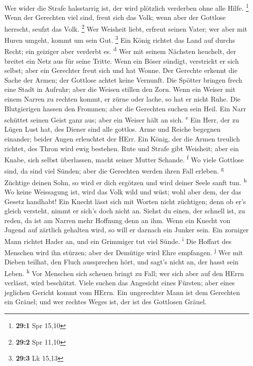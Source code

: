 Wer wider die Strafe halsstarrig ist, der wird plötzlich
verderben ohne alle Hilfe. \footnote{\textbf{29:1} Spr 15,10}
 Wenn der Gerechten viel sind, freut sich das Volk; wenn
aber der Gottlose herrscht, seufzt das Volk. \footnote{\textbf{29:2} Spr
  11,10}  Wer Weisheit liebt, erfreut seinen Vater; wer
aber mit Huren umgeht, kommt um sein Gut. \footnote{\textbf{29:3} Lk
  15,13}  Ein König richtet das Land auf durchs Recht; ein
geiziger aber verderbt es. \textsuperscript{d}  Wer mit
seinem Nächsten heuchelt, der breitet ein Netz aus für seine Tritte.
 Wenn ein Böser sündigt, verstrickt er sich selbst; aber
ein Gerechter freut sich und hat Wonne.  Der Gerechte
erkennt die Sache der Armen; der Gottlose achtet keine Vernunft.
 Die Spötter bringen frech eine Stadt in Aufruhr; aber die
Weisen stillen den Zorn.  Wenn ein Weiser mit einem Narren
zu rechten kommt, er zürne oder lache, so hat er nicht Ruhe.
 Die Blutgierigen hassen den Frommen; aber die Gerechten
suchen sein Heil.  Ein Narr schüttet seinen Geist ganz
aus; aber ein Weiser hält an sich. \textsuperscript{e} 
Ein Herr, der zu Lügen Lust hat, des Diener sind alle gottlos.
 Arme und Reiche begegnen einander; beider Augen
erleuchtet der HErr.  Ein König, der die Armen treulich
richtet, des Thron wird ewig bestehen.  Rute und Strafe
gibt Weisheit; aber ein Knabe, sich selbst überlassen, macht seiner
Mutter Schande. \textsuperscript{f}  Wo viele Gottlose
sind, da sind viel Sünden; aber die Gerechten werden ihren Fall erleben.
\textsuperscript{g}  Züchtige deinen Sohn, so wird er
dich ergötzen und wird deiner Seele sanft tun. \textsuperscript{h}
 Wo keine Weissagung ist, wird das Volk wild und wüst;
wohl aber dem, der das Gesetz handhabt!  Ein Knecht lässt
sich mit Worten nicht züchtigen; denn ob er's gleich versteht, nimmt er
sich's doch nicht an.  Siehst du einen, der schnell ist,
zu reden, da ist am Narren mehr Hoffnung denn an ihm. 
Wenn ein Knecht von Jugend auf zärtlich gehalten wird, so will er
darnach ein Junker sein.  Ein zorniger Mann richtet Hader
an, und ein Grimmiger tut viel Sünde. \textsuperscript{i}
 Die Hoffart des Menschen wird ihn stürzen; aber der
Demütige wird Ehre empfangen. \textsuperscript{j}  Wer
mit Dieben teilhat, den Fluch aussprechen hört, und sagt's nicht an, der
hasst sein Leben. \textsuperscript{k}  Vor Menschen sich
scheuen bringt zu Fall; wer sich aber auf den HErrn verlässt, wird
beschützt.  Viele suchen das Angesicht eines Fürsten;
aber eines jeglichen Gericht kommt vom HErrn.  Ein
ungerechter Mann ist dem Gerechten ein Gräuel; und wer rechtes Weges
ist, der ist des Gottlosen Gräuel.

